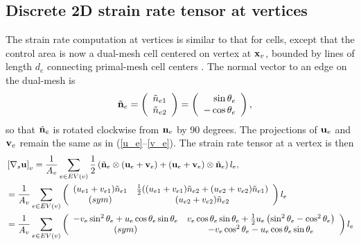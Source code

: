 \documentclass[11pt]{report}
\begin{document}
\subsection{Discrete 2D strain rate tensor at vertices}

The strain rate computation at vertices is similar to that for cells, except that the control area is now a dual-mesh cell centered on vertex at ${\bf x}_v$, bounded by lines of length $d_e$ connecting primal-mesh cell centers \cite[figure 1]{Ringler_ea10jcp}.  The normal vector to an edge on the dual-mesh is
\begin{eqnarray}
&&\tilde{\bf n}_e = \left( \begin{array}{c} \tilde{n}_{e1} \\ \tilde{n}_{e2} \end{array} \right)
  = \left( \begin{array}{r} \sin{\theta_{e}} \\ -\cos{\theta_{e}} \end{array} \right),
\end{eqnarray}
so that $\tilde{\bf n}_e$ is rotated clockwise from ${\bf n}_e$ by 90 degrees.  The projections of ${\bf u}_e$ and ${\bf v}_e$ remain the same as in (\ref{u_e}--\ref{v_e}).  The strain rate tensor at a vertex is then
\begin{eqnarray}
&\left[\nabla_s {\bf u} \right]_v
= \displaystyle \frac{1}{A_v} 
\sum_{e\in EV(v)}{\frac{1}{2}\left( 
  \tilde{\bf n}_e\otimes\left({\bf u}_e +{\bf v}_e \right)
+ \left({\bf u}_e +{\bf v}_e \right)\otimes\tilde{\bf n}_e\right)l_e },
\label{vertex strain rate tensor2}
\\
& = \displaystyle
\frac{1}{A_v} 
\sum_{e\in EV(v)} 
\left( \begin{array}{cc} (u_{e1} + v_{e1})\tilde{n}_{e1}  
               & \frac{1}{2}((u_{e1} + v_{e1})\tilde{n}_{e2} + (u_{e2} + v_{e2})\tilde{n}_{e1}) \\ 
                 (sym)  &
                       (u_{e2} + v_{e2})\tilde{n}_{e2} \end{array} \right) l_e
\\
&=\displaystyle\frac{1}{A_v} \sum_{e\in EV(v)} 
\left( \begin{array}{cc} -v_e \sin^2\theta_e + u_e \cos{\theta_e} \sin{\theta_e} 
 & v_e \cos{\theta_e} \sin{\theta_e} + \frac{1}{2}u_e\left(\sin^2\theta_e - \cos^2\theta_e\right)\\
   (sym)
 &                     -v_e \cos^2\theta_e - u_e \cos{\theta_e} \sin{\theta_e} \end{array} \right)l_e
\end{eqnarray}
\end{document}
